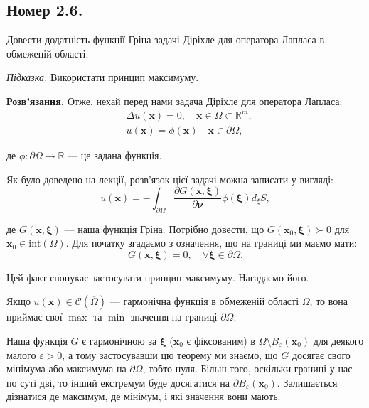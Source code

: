 \documentclass{hw_template}
\begin{document}
\pagebreak

\subsection{Номер 2.6.}

\begin{problem}
    Довести додатність функції Гріна задачі Діріхле для оператора Лапласа в обмеженій області. 
    
    \textit{Підказка.} Використати принцип максимуму.
\end{problem}

\textbf{Розв'язання.} Отже, нехай перед нами задача Діріхле для оператора Лапласа:
\begin{align*}
    &\Delta u(\mathbf{x}) = 0, \quad \mathbf{x} \in \Omega \subset \mathbb{R}^m, \\
    &u(\mathbf{x}) = \phi(\mathbf{x}) \quad \mathbf{x} \in \partial\Omega,
\end{align*}

де $\phi: \partial\Omega \to \mathbb{R}$ --- це задана функція.

Як було доведено на лекції, розв'язок цієї задачі можна записати у вигляді:
\begin{equation*}
    u(\mathbf{x}) = -\int_{\partial\Omega} \frac{\partial G(\mathbf{x},\boldsymbol{\xi})}{\partial\boldsymbol{\nu}}\phi(\boldsymbol{\xi})d_{\xi}S,
\end{equation*}

де $G(\mathbf{x},\boldsymbol{\xi})$ --- наша функція Гріна. Потрібно довести, що $G(\mathbf{x}_0, \boldsymbol{\xi}) \succ 0$ для $\mathbf{x}_0 \in \text{int}(\Omega)$. Для початку згадаємо з означення, що на границі ми маємо мати:
\begin{equation*}
    G(\mathbf{x}, \boldsymbol{\xi}) = 0, \quad \forall\boldsymbol{\xi} \in \partial\Omega.
\end{equation*}

Цей факт спонукає застосувати принцип максимуму. Нагадаємо його.
\begin{theorem}
    Якщо $u(\mathbf{x}) \in \mathcal{C}(\overline{\Omega})$ --- гармонічна функція в обмеженій області $\Omega$, то вона приймає свої $\max$ та $\min$ значення на границі $\partial\Omega$.
\end{theorem}

Наша функція $G$ є гармонічною за $\boldsymbol{\xi}$ ($\mathbf{x}_0$ є фіксованим) в $\Omega \setminus B_{\varepsilon}(\mathbf{x}_0)$ для деякого малого $\varepsilon > 0$, а тому застосувавши цю теорему ми знаємо, що $G$ досягає свого мінімума або максимума на $\partial\Omega$, тобто нуля. Більш того, оскільки границі у нас по суті дві, то інший екстремум буде досягатися на $\partial B_{\varepsilon}(\mathbf{x}_0)$. Залишається дізнатися де максимум, де мінімум, і які значення вони мають.
\end{document}
